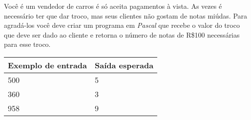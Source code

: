\item Você é um vendedor de carros é só aceita pagamentos à vista. As vezes 
é necessário ter que dar troco, mas seus clientes não gostam de notas miúdas.
Para agradá-los você deve criar um programa em \emph{Pascal} que recebe o valor
do troco que deve ser dado ao cliente e retorna o número de notas de R\$100 
necessárias para esse troco.

\begin{center}
\begin{tabular}{|l|l|} \hline
Exemplo de entrada & Saída esperada \\ \hline
500                & 5               \\ \hline
360                & 3               \\ \hline
958                & 9               \\ \hline
\end{tabular}
\end{center}
